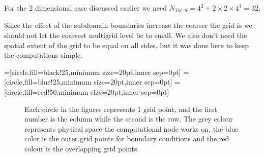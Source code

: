 		For the 2 dimensional case discussed earlier we need \( N_{Tot,S} = 4^2 + 2\times2\times4^1 = 32\).

		Since the effect of the subdomain boundaries increase the coarser the grid is
		we should not let the coarsest multigrid level be to small. We also don't need
		the spatial extent of the grid to be equal on all sides, but it was done here
		to keep the computations simple.

	=[circle,fill=black!25,minimum size=20pt,inner sep=0pt]
	=[circle,fill=blue!25,minimum size=20pt,inner sep=0pt]
	=[circle,fill=red!50,minimum size=20pt,inner sep=0pt]

	\begin{figure}
		\centering
			
		\caption{Each circle in the figures represents 1 grid point, and the first number is the column while the second is the row. The grey colour represents physical space the computational node works on, the blue color is the outer grid points for boundary conditions and the red colour is the overlapping grid points.}
		\label{fig:domain_part}
    \end{figure}
